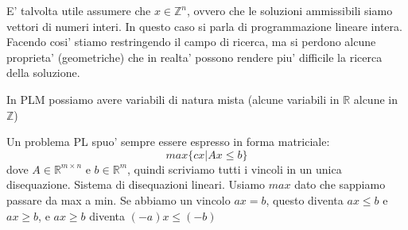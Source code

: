 E' talvolta utile assumere che $ x \in \mathbb{Z}^n $, ovvero che le soluzioni ammissibili siamo vettori di numeri interi. In questo caso si parla di programmazione lineare intera. Facendo cosi' stiamo restringendo il campo di ricerca, ma si perdono alcune proprieta' (geometriche) che in realta' possono rendere piu' difficile la ricerca della soluzione.

In PLM possiamo avere variabili di natura mista (alcune variabili in $ \mathbb{R} $ alcune in $ \mathbb{Z} $)

Un problema PL spuo' sempre essere espresso in forma matriciale:
\[
max \{cx | Ax \leq b\}
\]
dove $ A \in \mathbb{R}^{m \times n} $ e $ b \in \mathbb{R}^m $, quindi scriviamo tutti i vincoli in un unica disequazione. Sistema di disequazioni lineari. Usiamo $ max $ dato che sappiamo passare da max a min. Se abbiamo un vincolo $ ax = b $, questo diventa $ ax \leq b $ e $ ax \geq b $, e $ ax \geq b $ diventa $ (-a)x \leq (-b) $
% 
